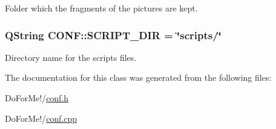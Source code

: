 Folder which the fragments of the pictures are kept. 

\hypertarget{struct_c_o_n_f_a28e3d7259ab1d7c0415d7e8cf48a76bd}{
\subsubsection[{S\-C\-R\-I\-P\-T\-\_\-\-D\-I\-R}]{\setlength{\rightskip}{0pt plus 5cm}Q\-String C\-O\-N\-F\-::\-S\-C\-R\-I\-P\-T\-\_\-\-D\-I\-R = \char`\"{}scripts/\char`\"{}\hspace{0.3cm}{\ttfamily [static]}}}\label{struct_c_o_n_f_a28e3d7259ab1d7c0415d7e8cf48a76bd}


Directory name for the scripts files. 



The documentation for this class was generated from the following files\-:\begin{DoxyCompactItemize}
\item 
Do\-For\-Me!/\hyperlink{conf_8h}{conf.\-h}\item 
Do\-For\-Me!/\hyperlink{conf_8cpp}{conf.\-cpp}\end{DoxyCompactItemize}
